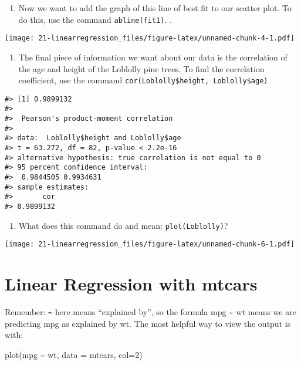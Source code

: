 \documentclass[
]{book}
\newenvironment{Shaded}{\begin{snugshade}}{\end{snugshade}}
\newcommand{\AttributeTok}[1]{\textcolor[rgb]{0.77,0.63,0.00}{#1}}
\newcommand{\DecValTok}[1]{\textcolor[rgb]{0.00,0.00,0.81}{#1}}
\newcommand{\FunctionTok}[1]{\textcolor[rgb]{0.00,0.00,0.00}{#1}}
\newcommand{\NormalTok}[1]{#1}
\newcommand{\SpecialCharTok}[1]{\textcolor[rgb]{0.00,0.00,0.00}{#1}}
\providecommand{\tightlist}{%
  \setlength{\itemsep}{0pt}\setlength{\parskip}{0pt}}
\begin{document}
\begin{enumerate}
\def\labelenumi{\arabic{enumi}.}
\setcounter{enumi}{4}
\tightlist
\item
  Now we want to add the graph of this line of best fit to our scatter plot. To do this, use the
  command \texttt{abline(fit1)}. .
\end{enumerate}

\texttt{[image: 21-linearregression\_files/figure-latex/unnamed-chunk-4-1.pdf]}

\begin{enumerate}
\def\labelenumi{\arabic{enumi}.}
\setcounter{enumi}{8}
\tightlist
\item
  The final piece of information we want about our data is the correlation of the age and height
  of the Loblolly pine trees. To find the correlation coefficient, use the command \texttt{cor(Loblolly\$height,\ Loblolly\$age)}
\end{enumerate}

\begin{verbatim}
#> [1] 0.9899132
#> 
#>  Pearson's product-moment correlation
#> 
#> data:  Loblolly$height and Loblolly$age
#> t = 63.272, df = 82, p-value < 2.2e-16
#> alternative hypothesis: true correlation is not equal to 0
#> 95 percent confidence interval:
#>  0.9844505 0.9934631
#> sample estimates:
#>       cor 
#> 0.9899132
\end{verbatim}

\begin{enumerate}
\def\labelenumi{\arabic{enumi}.}
\setcounter{enumi}{9}
\tightlist
\item
  What does this command do and mean: \texttt{plot(Loblolly)}?
\end{enumerate}

\texttt{[image: 21-linearregression\_files/figure-latex/unnamed-chunk-6-1.pdf]}

\hypertarget{linear-regression-with-mtcars}{%
\chapter{Linear Regression with mtcars}\label{linear-regression-with-mtcars}}

Remember: \textbf{\texttt{\textasciitilde{}}} here means ``explained by'', so the formula mpg \textasciitilde{} wt means we are predicting mpg as explained by wt. The most helpful way to view the output is with:

\begin{Shaded}
\begin{Highlighting}[]
\FunctionTok{plot}\NormalTok{(mpg }\SpecialCharTok{\textasciitilde{}}\NormalTok{ wt, }\AttributeTok{data =}\NormalTok{ mtcars, }\AttributeTok{col=}\DecValTok{2}\NormalTok{)}
\end{Highlighting}
\end{Shaded}
\end{document}

